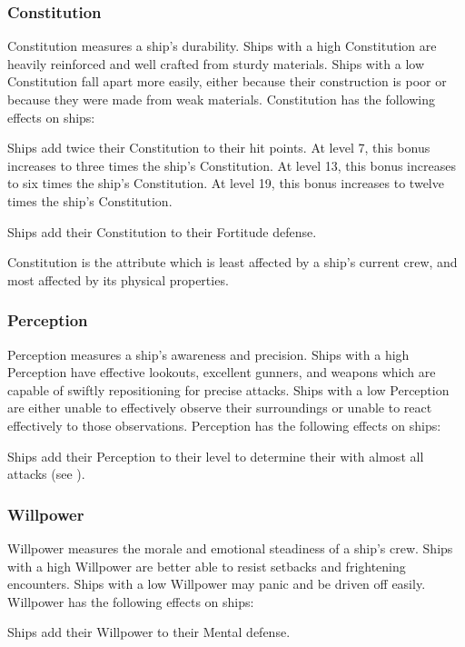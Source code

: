         \subsubsection{Constitution}
            Constitution measures a ship's durability.
            Ships with a high Constitution are heavily reinforced and well crafted from sturdy materials.
            Ships with a low Constitution fall apart more easily, either because their construction is poor or because they were made from weak materials.
            Constitution has the following effects on ships:
            \begin{raggeditemize}
                \item Ships add twice their Constitution to their hit points.
                    At level 7, this bonus increases to three times the ship's Constitution.
                    At level 13, this bonus increases to six times the ship's Constitution.
                    At level 19, this bonus increases to twelve times the ship's Constitution.
                \item Ships add their Constitution to their Fortitude defense.
            \end{raggeditemize}

            Constitution is the attribute which is least affected by a ship's current crew, and most affected by its physical properties.

        \subsubsection{Perception}
            Perception measures a ship's awareness and precision.
            Ships with a high Perception have effective lookouts, excellent gunners, and weapons which are capable of swiftly repositioning for precise attacks.
            Ships with a low Perception are either unable to effectively observe their surroundings or unable to react effectively to those observations.
            Perception has the following effects on ships:
            \begin{raggeditemize}
                \item Ships add their Perception to their level to determine their  with almost all attacks (see ).
            \end{raggeditemize}

        \subsubsection{Willpower}
            Willpower measures the morale and emotional steadiness of a ship's crew.
            Ships with a high Willpower are better able to resist setbacks and frightening encounters.
            Ships with a low Willpower may panic and be driven off easily.
            Willpower has the following effects on ships:
            \begin{raggeditemize}
                \item Ships add their Willpower to their Mental defense.
            \end{raggeditemize}

